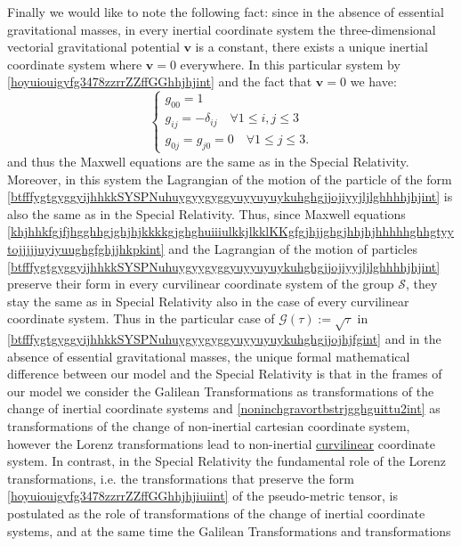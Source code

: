 \documentclass{article}
\theoremstyle{definition}
\theoremstyle{remark}
\renewcommand{\vec}[1]{\mathbf{#1}}
\newcommand{\er}{\eqref}
\newcommand{\er}{\eqref}
\begin{document}
Finally we would like to note the following fact: since in the
absence of essential gravitational masses, in every inertial
coordinate system the three-dimensional vectorial gravitational
potential $\vec v$ is a constant,
there exists a unique inertial coordinate system where $\vec v=0$
everywhere. In this particular system by
\er{hoyuiouigyfg3478zzrrZZffGGhhjhjint} and the fact that $\vec v=0$
we have:
\begin{equation}\label{hoyuiouigyfg3478zzrrZZffGGhhjhjiuiint}
\begin{cases}
g_{00}=1\\
g_{ij}=-\delta_{ij}\quad\forall 1\leq i,j\leq 3\\
g_{0j}=g_{j0}=0\quad\forall 1\leq j\leq 3.
\end{cases}
\end{equation}
and thus the Maxwell equations are the same as in the Special
Relativity. Moreover, in this system the Lagrangian of the motion of
the particle of the form
\er{btfffygtgyggyijhhkkSYSPNuhuygyygyggyuyyuyuykuhghgjjojiyyjljlghhhhjhjint}
is also the same as in the Special Relativity. Thus, since Maxwell
equations
\er{khjhhkfgjfjhgghhgjghjhjkkkkgjghghuiiiulkkjlkklKKgfgjhjjghgjhhjhjhhhhhghhgtyytojjjjjuyiyuughgfghjjhkpkint}
and the Lagrangian of the motion of particles
\er{btfffygtgyggyijhhkkSYSPNuhuygyygyggyuyyuyuykuhghgjjojiyyjljlghhhhjhjint}
preserve their form in every curvilinear coordinate system of the
group $\mathcal{S}$, they stay the same as in Special Relativity
also in the case of every curvilinear coordinate system. Thus in the
particular case of $\mathcal{G}(\tau):=\sqrt{\tau}$ in
\er{btfffygtgyggyijhhkkSYSPNuhuygyygyggyuyyuyuykuhghgjjojhjfgint}
and in the absence of essential gravitational masses, the unique
formal mathematical difference between our model and the Special
Relativity is that in the frames of our model we consider the
Galilean Transformations as transformations of the change of
inertial coordinate systems and
\er{noninchgravortbstrjgghguittu2int} as transformations of the
change of non-inertial cartesian coordinate system, however the
Lorenz transformations lead to non-inertial \underline{curvilinear}
coordinate system. In contrast, in the Special Relativity the
fundamental role of the Lorenz transformations, i.e. the
transformations that preserve the form
\er{hoyuiouigyfg3478zzrrZZffGGhhjhjiuiint} of the pseudo-metric
tensor, is postulated as the role of transformations of the change
of inertial coordinate systems, and at the same time the Galilean
Transformations and transformations
\end{document}
